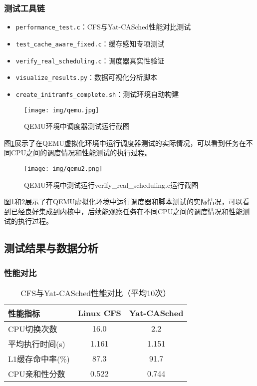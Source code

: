 \subsubsection{测试工具链}
\begin{itemize}
    \item \texttt{performance\_test.c}：CFS与Yat-CASched性能对比测试
    \item \texttt{test\_cache\_aware\_fixed.c}：缓存感知专项测试  
    \item \texttt{verify\_real\_scheduling.c}：调度器真实性验证
    \item \texttt{visualize\_results.py}：数据可视化分析脚本
    \item \texttt{create\_initramfs\_complete.sh}：测试环境自动构建
\end{itemize}

\begin{figure}[H]
\centering
\texttt{[image: img/qemu.jpg]}
\caption{QEMU环境中调度器测试运行截图}
\label{fig:qemu-running}
\end{figure}

图\ref{fig:qemu-running}展示了在QEMU虚拟化环境中运行调度器测试的实际情况，可以看到任务在不同CPU之间的调度情况和性能测试的执行过程。

\begin{figure}[H]
\centering
\texttt{[image: img/qemu2.png]}
\caption{QEMU环境中测试运行verify\_real\_scheduling.c运行截图}
\label{fig:qemu-running2}
\end{figure}

图\ref{fig:qemu-running}和\ref{fig:qemu-running2}展示了在QEMU虚拟化环境中运行调度器和脚本测试的实际情况，可以看到已经良好集成到内核中，后续能观察任务在不同CPU之间的调度情况和性能测试的执行过程。

\subsection{测试结果与数据分析}

\subsubsection{性能对比}
\begin{table}[H]
\centering
\caption{CFS与Yat-CASched性能对比（平均10次）}
\begin{tabular}{|l|c|c|}
\hline
\textbf{性能指标} & \textbf{Linux CFS} & \textbf{Yat-CASched} \\
\hline
CPU切换次数 & 16.0 & 2.2 \\
\hline
平均执行时间(s) & 1.161 & 1.151 \\
\hline
L1缓存命中率(\%) & 87.3 & 91.7 \\
\hline
CPU亲和性分数 & 0.522 & 0.744 \\
\hline
\end{tabular}
\end{table}

